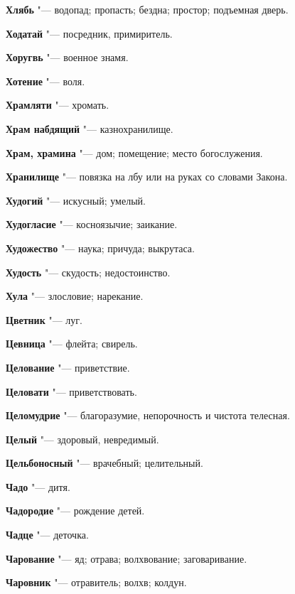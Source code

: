 \begin{mymulticols}
\noindent\textbf{Хлябь} "--- водопад; пропасть; бездна; простор; подъемная дверь. 

\noindent\textbf{Ходатай} "--- посредник, примиритель. 

\noindent\textbf{Хоругвь} "--- военное знамя. 

\noindent\textbf{Хотение} "--- воля. 

\noindent\textbf{Храмляти} "--- хромать. 

\noindent\textbf{Храм набдящий} "--- казнохранилище. 

\noindent\textbf{Храм, храмина} "--- дом; помещение; место богослужения. 

\noindent\textbf{Хранилище} "--- повязка на лбу или на руках со словами Закона. 

\noindent\textbf{Худогий} "--- искусный; умелый. 

\noindent\textbf{Худогласие} "--- косноязычие; заикание. 

\noindent\textbf{Художество} "--- наука; причуда; выкрутаса. 

\noindent\textbf{Худость} "--- скудость; недостоинство. 

\noindent\textbf{Хула} "--- злословие; нарекание. 

\bukvaending


\noindent\textbf{Цветник} "--- луг. 

\noindent\textbf{Цевница} "--- флейта; свирель. 

\noindent\textbf{Целование} "--- приветствие. 

\noindent\textbf{Целовати} "--- приветствовать. 

\noindent\textbf{Целомудрие} "--- благоразумие, непорочность и чистота телесная. 

\noindent\textbf{Целый} "--- здоровый, невредимый. 

\noindent\textbf{Цельбоносный} "--- врачебный; целительный. 

\bukvaending


\noindent\textbf{Чадо} "--- дитя. 

\noindent\textbf{Чадородие} "--- рождение детей. 

\noindent\textbf{Чадце} "--- деточка. 

\noindent\textbf{Чарование} "--- яд; отрава; волхвование; заговаривание. 

\noindent\textbf{Чаровник} "--- отравитель; волхв; колдун. 


\end{mymulticols}
